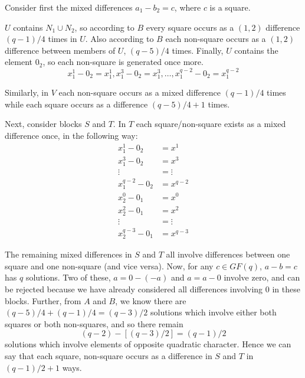 Consider first the mixed differences $a_1 - b_2 = c$, where $c$ is a square.

$U$ contains $N_1 \cup N_2$, so according to $B$ every square occurs as a $(1, 2)$ difference $(q - 1)/4$ times in $U$.
Also according to $B$ each non-square occurs as a $(1, 2)$ difference between members of $U$, $(q - 5)/4$ times.
Finally, $U$ contains the element $0_2$, so each non-square is generated once more.
\begin{equation}
x_1^1 - 0_2 = x^1_1, x_1^3 - 0_2 = x_1^3, \ldots, x_1^{q - 2} - 0_2 = x_1^{q - 2}
\end{equation}

Similarly, in $V$ each non-square occurs as a mixed difference $(q - 1)/4$ times while each square occurs as a difference $(q - 5)/4 + 1$ times.

Next, consider blocks $S$ and $T$.
In $T$ each square/non-square exists as a mixed difference once, in the following way:
\begin{align*}
       x_1^1 - 0_2   &= x^1      \\
       x_1^3 - 0_2   &= x^3      \\
           \vdots    &= \vdots   \\             
   x^{q-2}_1 - 0_2   &= x^{q - 2}
\end{align*}
\begin{align*}
       x_2^0 - 0_1   &= x^0      \\
       x_2^2 - 0_1   &= x^2      \\
    \vdots           &= \vdots   \\         
   x^{q-3}_2 - 0_1   &= x^{q-3}
\end{align*}

The remaining mixed differences in $S$ and $T$ all involve differences between one square and one non-square (and vice versa).
Now, for any $c \in GF(q)$, $a - b = c$ has $q$ solutions.
Two of these, $a = 0 - (-a)$ and $a = a - 0$ involve zero, and can be rejected because we have already considered all differences involving 0 in these blocks.
Further, from $A$ and $B$, we know there are $(q - 5)/4 + (q - 1)/4 = (q - 3)/2$ solutions which involve either both squares or both non-squares, and so there remain
\begin{equation}
(q - 2) - [(q - 3)/2] = (q - 1)/2
\end{equation}
solutions which involve elements of opposite quadratic character.
Hence we can say that each square, non-square occurs as a difference in $S$ and $T$ in $(q - 1)/2 + 1$ ways.

